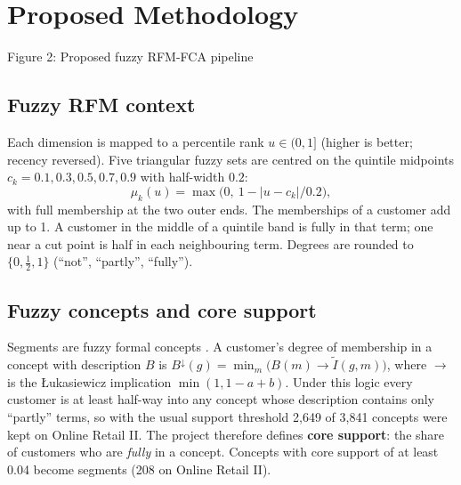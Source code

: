 \documentclass[11pt,a4paper]{article}
\newcommand{\flowitem}[2]{\textbf{#1}\\#2}
\begin{document}
\newpage
\section{Proposed Methodology}\label{sec:method}

\begin{center}
\par
\small Figure 2: Proposed fuzzy RFM-FCA pipeline
\end{center}

\subsection{Fuzzy RFM context}
Each dimension is mapped to a percentile rank $u \in (0,1]$ (higher is better; recency reversed). Five triangular fuzzy sets are centred on the quintile midpoints $c_k = 0.1, 0.3, 0.5, 0.7, 0.9$ with half-width $0.2$:
\[
\mu_k(u) = \max\bigl(0,\ 1 - |u - c_k| / 0.2\bigr),
\]
with full membership at the two outer ends. The memberships of a customer add up to 1. A customer in the middle of a quintile band is fully in that term; one near a cut point is half in each neighbouring term. Degrees are rounded to $\{0, \tfrac12, 1\}$ (``not'', ``partly'', ``fully'').

\subsection{Fuzzy concepts and core support}
Segments are fuzzy formal concepts \cite{belohlavek2004}. A customer's degree of membership in a concept with description $B$ is $B^{\downarrow}(g) = \min_m \bigl(B(m) \to \tilde I(g,m)\bigr)$, where $\to$ is the Łukasiewicz implication $\min(1, 1-a+b)$. Under this logic every customer is at least half-way into any concept whose description contains only ``partly'' terms, so with the usual support threshold 2,649 of 3,841 concepts were kept on Online Retail II. The project therefore defines \textbf{core support}: the share of customers who are \emph{fully} in a concept. Concepts with core support of at least 0.04 become segments (208 on Online Retail II).
\end{document}
